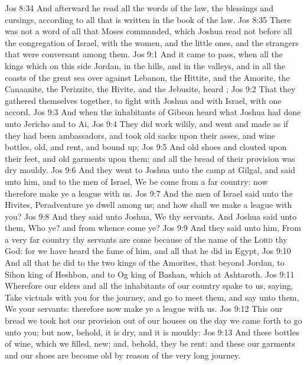 \vs Jos 8:34 And afterward he read all the words of the law, the blessings and cursings, according to all that is written in the book of the law.
\vs Jos 8:35 There was not a word of all that Moses commanded, which Joshua read not before all the congregation of Israel, with the women, and the little ones, and the strangers that were conversant among them.
\vs Jos 9:1 And it came to pass, when all the kings which  on this side Jordan, in the hills, and in the valleys, and in all the coasts of the great sea over against Lebanon, the Hittite, and the Amorite, the Canaanite, the Perizzite, the Hivite, and the Jebusite, heard ;
\vs Jos 9:2 That they gathered themselves together, to fight with Joshua and with Israel, with one accord.
\vs Jos 9:3 And when the inhabitants of Gibeon heard what Joshua had done unto Jericho and to Ai,
\vs Jos 9:4 They did work wilily, and went and made as if they had been ambassadors, and took old sacks upon their asses, and wine bottles, old, and rent, and bound up;
\vs Jos 9:5 And old shoes and clouted upon their feet, and old garments upon them; and all the bread of their provision was dry  mouldy.
\vs Jos 9:6 And they went to Joshua unto the camp at Gilgal, and said unto him, and to the men of Israel, We be come from a far country: now therefore make ye a league with us.
\vs Jos 9:7 And the men of Israel said unto the Hivites, Peradventure ye dwell among us; and how shall we make a league with you?
\vs Jos 9:8 And they said unto Joshua, We  thy servants. And Joshua said unto them, Who  ye? and from whence come ye?
\vs Jos 9:9 And they said unto him, From a very far country thy servants are come because of the name of the \textsc{Lord} thy God: for we have heard the fame of him, and all that he did in Egypt,
\vs Jos 9:10 And all that he did to the two kings of the Amorites, that  beyond Jordan, to Sihon king of Heshbon, and to Og king of Bashan, which  at Ashtaroth.
\vs Jos 9:11 Wherefore our elders and all the inhabitants of our country spake to us, saying, Take victuals with you for the journey, and go to meet them, and say unto them, We  your servants: therefore now make ye a league with us.
\vs Jos 9:12 This our bread we took hot  our provision out of our houses on the day we came forth to go unto you; but now, behold, it is dry, and it is mouldy:
\vs Jos 9:13 And these bottles of wine, which we filled,  new; and, behold, they be rent: and these our garments and our shoes are become old by reason of the very long journey.
